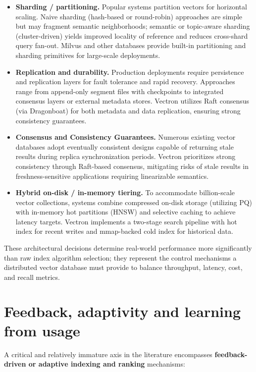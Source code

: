 \begin{itemize}
    \item \textbf{Sharding / partitioning.} Popular systems partition vectors for horizontal scaling. Naive sharding (hash-based or round-robin) approaches are simple but may fragment semantic neighborhoods; semantic or topic-aware sharding (cluster-driven) yields improved locality of reference and reduces cross-shard query fan-out. Milvus and other databases provide built-in partitioning and sharding primitives for large-scale deployments.
    
    \item \textbf{Replication and durability.} Production deployments require persistence and replication layers for fault tolerance and rapid recovery. Approaches range from append-only segment files with checkpoints to integrated consensus layers or external metadata stores. Vectron utilizes Raft consensus (via Dragonboat) for both metadata and data replication, ensuring strong consistency guarantees.
    
    \item \textbf{Consensus and Consistency Guarantees.} Numerous existing vector databases adopt eventually consistent designs capable of returning stale results during replica synchronization periods. Vectron prioritizes strong consistency through Raft-based consensus, mitigating risks of stale results in freshness-sensitive applications requiring linearizable semantics.
    
    \item \textbf{Hybrid on-disk / in-memory tiering.} To accommodate billion-scale vector collections, systems combine compressed on-disk storage (utilizing PQ) with in-memory hot partitions (HNSW) and selective caching to achieve latency targets. Vectron implements a two-stage search pipeline with hot index for recent writes and mmap-backed cold index for historical data.
\end{itemize}

These architectural decisions determine real-world performance more significantly than raw index algorithm selection; they represent the control mechanisms a distributed vector database must provide to balance throughput, latency, cost, and recall metrics.

\section{Feedback, adaptivity and learning from usage}
A critical and relatively immature axis in the literature encompasses \textbf{feedback-driven or adaptive indexing and ranking} mechanisms:

